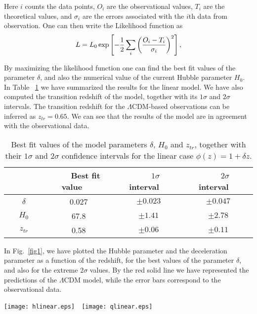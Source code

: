 \documentclass[aps,superscriptaddress, showpacs,preprintnumbers, superscriptaddress, nofootinbibt,twocolumn]{revtex4-2}
\begin{document}
Here $i$ counts the data points, $O_i$ are the observational values, $T_i$ are the theoretical values, and $\sigma_i$ are the errors associated with the $i$th data from observation. One can then write the Likelihood function as
\begin{align}
L=L_0\,\textmd{exp}\left[-\frac12\sum_i\left(\frac{O_i-T_i}{\sigma_i}\right)^2\right],
\end{align}

By maximizing the likelihood function one can find the best fit values of the parameter $\delta $, and also the numerical value of the current Hubble parameter $H_0$. In Table ~\ref{tab1} we have summarized the results for the linear model. We have also computed the transition redshift of the model, together with its $1\sigma$ and $2\sigma$ intervals. The transition redshift for the $\Lambda$CDM-based observations can be inferred as $z_{tr}=0.65$. We can see that the results of the model are in agreement with the observational data.
\begin{table}[h!]
	\begin{center}
		\begin{tabular}{|c||c|c|c|}
			\hline
			~~~~~~~&~~~Best fit value~~~&~~~$1\sigma$~interval~~~&~~~$2\sigma$~interval~~~\\
				\hline%
		$\delta $&0.027&$\pm0.023$&$\pm0.047$\\
		\hline
		$H_0$&67.8&$\pm1.41$&$\pm2.78$\\
			\hline
			$z_{tr}$&0.58&$\pm0.06$&$\pm0.11$\\
			\hline
		\end{tabular}
	\end{center}
	\caption{Best fit values of the model parameters $\delta$, $H_0$ and $z_{tr}$, together with their $1\sigma$ and $2\sigma$ confidence intervals for the linear case $\phi (z)=1+\delta z$.\label{tab1}}
\end{table}

In Fig.~\ref{fig1}, we have plotted the Hubble parameter and the deceleration parameter as a function of the redshift, for the best values of the parameter $\delta $, and also for the extreme $2\sigma$ values. By the red solid line we have represented the predictions of the $\Lambda$CDM model, while the error bars correspond to the observational data.

\begin{figure*}[htbp]
	\texttt{[image: hlinear.eps]}~~\texttt{[image: qlinear.eps]}
	\caption{\label{fig1}The evolution of the Hubble parameter (left panel) and of the deceleration parameter (right panel) as a function of the redshift $z$ in the linear case $\phi(z)=1+\delta z$. The dashed, dotted and dot-dashed curves correspond to the best fit and lower/higher $2\sigma$ extreme values of the parameter $\delta $ in the Table~\ref{tab1}. The red solid line corresponds to the $\Lambda$CDM model, and the error bars represent the observational data.}
\end{figure*}
\end{document}

